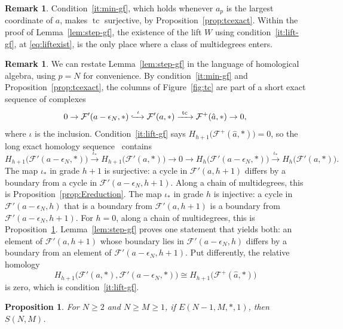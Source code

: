 \documentclass[12pt]{amsart}
\newtheorem{proposition}[theorem]{Proposition}
\theoremstyle{definition}
\newtheorem{remark1}[theorem]{Remark}
\theoremstyle{remark}
\newcommand{\tc}{\operatorname{tc}}
\def\what{\hat}
\newcommand{\FF}{\mathcal F}
\begin{document}
\begin{remark1}
Condition~\ref{it:min-gf}, which holds whenever $a_p$ is the largest coordinate of
$a$, makes $\tc$ surjective, by Proposition~\ref{prop:tcexact}.
Within the proof of Lemma~\ref{lem:step-gf}, 
the existence of the lift $W$ using condition~\ref{it:lift-gf}, at \eqref{eq:liftexist},
is the only place where a class of multidegrees enters. 
\end{remark1}

\begin{remark1}\label{rem:stepLES}
We can restate Lemma~\ref{lem:step-gf} in the language of homological algebra,
using $p = N$ for convenience.
By condition~\ref{it:min-gf} and Proposition~\ref{prop:tcexact},
the columns of Figure~\ref{fig:tc} are part of
a short exact sequence of complexes
\[ 0\to \FF'(a-\epsilon_N,*) \xhookrightarrow{\ \iota\ } \FF'(a,*)
   \xrightarrow{\ \tc\ } \FF^+(\what a,*)\to 0,\]
where $\iota$ is the inclusion.
Condition~\ref{it:lift-gf} says $H_{h+1}\bigl(\FF^+(\what a,*)\bigr)=0$, so
the long exact homology sequence~\cite[\S1.3]{Weibel} contains
\[
H_{h+1}\bigl(\FF'(a-\epsilon_N,*)\bigr) \xrightarrow{\ \iota_*\ } H_{h+1}\bigl(\FF'(a,*)\bigr)
   \to 0 \to H_h\bigl(\FF'(a-\epsilon_N,*)\bigr) \xrightarrow{\ \iota_*\ } H_h\bigl(\FF'(a,*)\bigr). \]
The map $\iota_*$ in grade $h+1$ is surjective: a cycle in $\FF'(a,h+1)$ differs by a
boundary from a cycle in $\FF'(a-\epsilon_N,h+1)$.  Along a chain of multidegrees, this is
Proposition~\ref{prop:Ereduction}.  The map $\iota_*$ in grade $h$ is injective: a cycle in
$\FF'(a-\epsilon_N,h)$ that is a boundary from $\FF'(a,h+1)$ is a boundary
from $\FF'(a-\epsilon_N,h+1)$.  For $h=0$, along a chain of multidegrees, this is
Proposition~\ref{prop:reduction}.  Lemma~\ref{lem:step-gf} proves one
statement that yields both: an element of $\FF'(a,h+1)$ whose boundary lies in
$\FF'(a-\epsilon_N,h)$ differs by a boundary from an element of
$\FF'(a-\epsilon_N,h+1)$.  Put differently, the relative homology
\[
H_{h+1}\bigl(\FF'(a, *), \FF'(a - \epsilon_N, *) \bigr) \cong H_{h+1}\bigl(\FF^+({\what a}, *) \bigr)
\]
is zero, which is condition~\ref{it:lift-gf}.
\end{remark1}


\begin{proposition}\label{prop:reduction}
For $N \geq 2$ and $N \geq M \geq 1$, if $E(N-1, M, *, 1)$, then $S(N, M)$.
\end{proposition}
\end{document}
